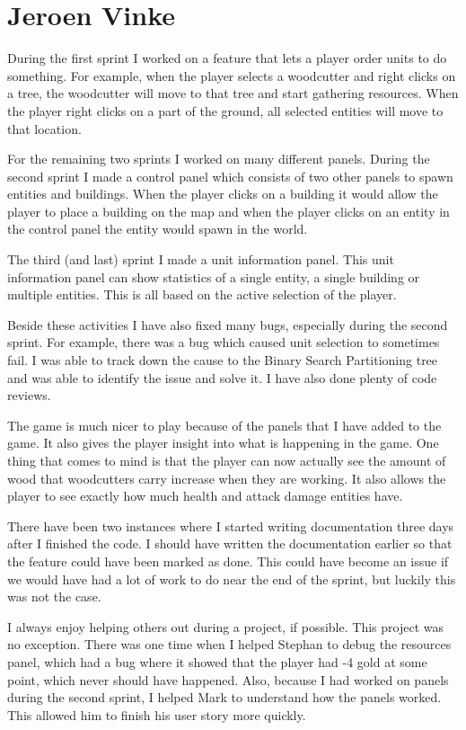 \section{Jeroen Vinke}
During the first sprint I worked on a feature that lets a player order units to do something. For example, when the player selects a woodcutter and right clicks on a tree, the woodcutter will move to that tree and start gathering resources. When the player right clicks on a part of the ground, all selected entities will move to that location.

For the remaining two sprints I worked on many different panels. During the second sprint I made a control panel which consists of two other panels to spawn entities and buildings. When the player clicks on a building it would allow the player to place a building on the map and when the player clicks on an entity in the control panel the entity would spawn in the world.

The third (and last) sprint I made a unit information panel. This unit information panel can show statistics of a single entity, a single building or multiple entities. This is all based on the active selection of the player. 

Beside these activities I have also fixed many bugs, especially during the second sprint. For example, there was a bug which caused unit selection to sometimes fail. I was able to track down the cause to the Binary Search Partitioning tree and was able to identify the issue and solve it. I have also done plenty of code reviews.
 
The game is much nicer to play because of the panels that I have added to the game. It also gives the player insight into what is happening in the game. One thing that comes to mind is that the player can now actually see the amount of wood that woodcutters carry increase when they are working. It also allows the player to see exactly how much health and attack damage entities have. 

There have been two instances where I started writing documentation three days after I finished the code. I should have written the documentation earlier so that the feature could have been marked as done. This could have become an issue if we would have had a lot of work to do near the end of the sprint, but luckily this was not the case.

I always enjoy helping others out during a project, if possible. This project was no exception. There was one time when I helped Stephan to debug the resources panel, which had a bug where it showed that the player had -4 gold at some point, which never should have happened. Also, because I had worked on panels during the second sprint, I helped Mark to understand how the panels worked. This allowed him to finish his user story more quickly.

